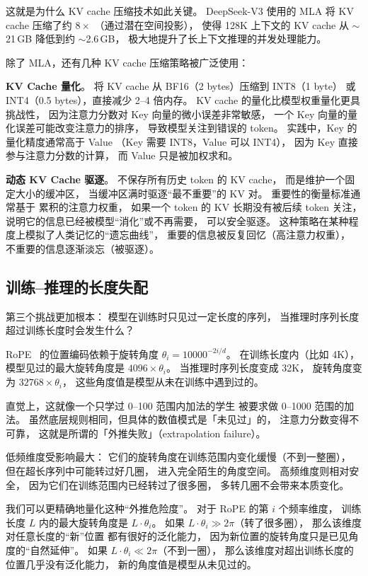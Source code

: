 这就是为什么 KV cache 压缩技术如此关键。
DeepSeek-V3 使用的 MLA 将 KV cache 压缩了约 $8\times$
（通过潜在空间投影），
使得 128K 上下文的 KV cache 从 $\sim$21\,GB
降低到约 $\sim$2.6\,GB，
极大地提升了长上下文推理的并发处理能力。

除了 MLA，还有几种 KV cache 压缩策略被广泛使用：

\textbf{KV Cache 量化}。
将 KV cache 从 BF16（2 bytes）压缩到 INT8（1 byte）
或 INT4（0.5 bytes），直接减少 2--4 倍内存。
KV cache 的量化比模型权重量化更具挑战性，
因为注意力分数对 Key 向量的微小误差非常敏感，
一个 Key 向量的量化误差可能改变注意力的排序，
导致模型关注到错误的 token。
实践中，Key 的量化精度通常高于 Value
（Key 需要 INT8，Value 可以 INT4），
因为 Key 直接参与注意力分数的计算，
而 Value 只是被加权求和。

\textbf{动态 KV Cache 驱逐}。
不保存所有历史 token 的 KV cache，
而是维护一个固定大小的缓冲区，
当缓冲区满时驱逐“最不重要”的 KV 对。
重要性的衡量标准通常基于
累积的注意力权重，
如果一个 token 的 KV 长期没有被后续 token 关注，
说明它的信息已经被模型“消化”或不再需要，
可以安全驱逐。
这种策略在某种程度上模拟了人类记忆的“遗忘曲线”，
重要的信息被反复回忆（高注意力权重），
不重要的信息逐渐淡忘（被驱逐）。

\subsection{训练--推理的长度失配}

第三个挑战更加根本：
模型在训练时只见过一定长度的序列，
当推理时序列长度超过训练长度时会发生什么？

RoPE~\cite{su2021rope} 的位置编码依赖于旋转角度
$\theta_i = 10000^{-2i/d}$。
在训练长度内（比如 4K），
模型见过的最大旋转角度是 $4096 \times \theta_i$。
当推理时序列长度变成 32K，
旋转角度变为 $32768 \times \theta_i$，
这些角度值是模型从未在训练中遇到过的。

直觉上，这就像一个只学过 0--100 范围内加法的学生
被要求做 0--1000 范围的加法。
虽然底层规则相同，但具体的数值模式是「未见过」的，
注意力分数变得不可靠，
这就是所谓的「外推失败」（extrapolation failure）。

低频维度受影响最大：
它们的旋转角度在训练范围内变化缓慢（不到一整圈），
但在超长序列中可能转过好几圈，
进入完全陌生的角度空间。
高频维度则相对安全，
因为它们在训练范围内已经转过了很多圈，
多转几圈不会带来本质变化。

我们可以更精确地量化这种“外推危险度”。
对于 RoPE 的第 $i$ 个频率维度，
训练长度 $L$ 内的最大旋转角度是 $L \cdot \theta_i$。
如果 $L \cdot \theta_i \gg 2\pi$（转了很多圈），
那么该维度对任意长度的“新”位置
都有很好的泛化能力，
因为新位置的旋转角度只是已见角度的“自然延伸”。
如果 $L \cdot \theta_i \ll 2\pi$（不到一圈），
那么该维度对超出训练长度的位置几乎没有泛化能力，
新的角度值是模型从未见过的。

